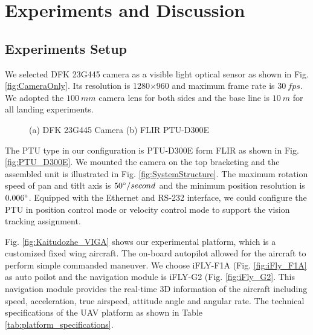 \section{Experiments and Discussion}
\subsection{Experiments Setup}
We selected DFK 23G445 camera as a visible light optical sensor as shown in Fig. \ref{fig:CameraOnly}. Its resolution is 1280$\times$960 and maximum frame rate is $30\ fps$. We adopted the $100\ mm$ camera lens for both sides and the base line is $10\ m$ for all landing experiments.
 


\begin{figure}[!tb]
	\centering
	\caption{(a) DFK 23G445 Camera (b) FLIR PTU-D300E}
\end{figure}

The PTU type in our configuration is PTU-D300E form FLIR as shown in Fig.\ref{fig:PTU_D300E}. We mounted the camera on the top bracketing and the assembled unit is illustrated in Fig. \ref{fig:SystemStructure}. The maximum rotation speed of pan and titlt axis is $50\degree/second$ and the minimum position resolution is $0.006\degree$. Equipped with the Ethernet and RS-232 interface, we could configure the PTU in position control mode or velocity control mode to support the vision tracking assignment.

Fig. \ref{fig:Kaitudozhe_VIGA} shows our experimental platform, which is a customized fixed wing aircraft. The on-board autopilot allowed for the aircraft to perform simple commanded maneuver. We choose iFLY-F1A (Fig. \ref{fig:iFly_F1A} as auto poilot and the navigation module is iFLY-G2 (Fig. \ref{fig:iFly_G2}. This navigation module provides the real-time 3D information of the aircraft including speed, acceleration, true airspeed, attitude angle and angular rate. The technical specifications of the UAV platform as shown in Table \ref{tab:platform_specifications}.

